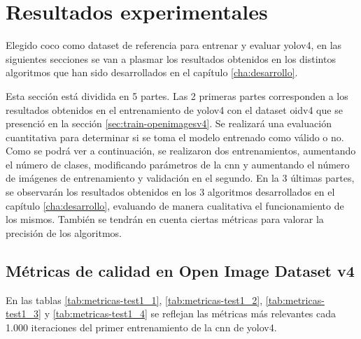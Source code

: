 \section{Resultados experimentales}
\label{sec:resultados-experimentales}

Elegido \gls{coco} como dataset de referencia para entrenar y evaluar \gls{yolov4}, en las siguientes secciones se van a plasmar los resultados obtenidos en los distintos algoritmos que han sido desarrollados en el capítulo \ref{cha:desarrollo}.

Esta sección está dividida en 5 partes. Las 2 primeras partes corresponden a los resultados obtenidos en el entrenamiento de \gls{yolov4} con el dataset \gls{oidv4} que se presenció en la sección \ref{sec:train-openimagesv4}. Se realizará una evaluación cuantitativa para determinar si se toma el modelo entrenado como válido o no. Como se podrá ver a continuación, se realizaron dos entrenamientos, aumentando el número de clases, modificando parámetros de la \gls{cnn} y aumentando el número de imágenes de entrenamiento y validación en el segundo. En la 3 últimas partes, se observarán los resultados obtenidos en los 3 algoritmos desarrollados en el capítulo \ref{cha:desarrollo}, evaluando de manera cualitativa el funcionamiento de los mismos. También se tendrán en cuenta ciertas métricas para valorar la precisión de los algoritmos.

\subsection{Métricas de calidad en Open Image Dataset v4}
\label{subsec:metricas-calidad-openimagesv4}

En las tablas \ref{tab:metricas-test1_1}, \ref{tab:metricas-test1_2}, \ref{tab:metricas-test1_3} y \ref{tab:metricas-test1_4} se reflejan las métricas más relevantes cada 1.000 iteraciones del primer entrenamiento de la \gls{cnn} de \gls{yolov4}.

